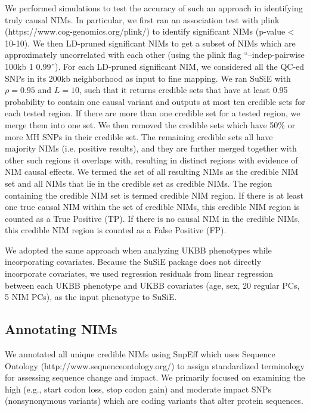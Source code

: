 We performed simulations to test the accuracy of such an approach in identifying truly causal NIMs. In particular, we first ran an association test with plink (https://www.cog-genomics.org/plink/) to identify significant NIMs (p-value < 10-10). We then LD-pruned significant NIMs to get a subset of NIMs which are approximately uncorrelated with each other (using the plink flag ``--indep-pairwise 100kb 1 0.99''). For each LD-pruned significant NIM, we considered all the QC-ed SNPs in its 200kb neighborhood as input to fine mapping. We ran SuSiE with $\rho = 0.95$ and $L = 10$, such that it returns credible sets that have at least 0.95 probability to contain one causal variant and outputs at most ten credible sets for each tested region. If there are more than one credible set for a tested region, we merge them into one set. We then removed the credible sets which have 50\% or more MH SNPs in their credible set. The remaining credible sets all have majority NIMs (i.e. positive results), and they are further merged together with other such regions it overlaps with, resulting in distinct regions with evidence of NIM causal effects. We termed the set of all resulting NIMs as the credible NIM set and all NIMs that lie in the credible set as credible NIMs. The region containing the credible NIM set is termed credible NIM region. If there is at least one true causal NIM within the set of credible NIMs, this credible NIM region is counted as a True Positive (TP). If there is no causal NIM in the credible NIMs, this credible NIM region is counted as a False Positive (FP). 
 
We adopted the same approach when analyzing UKBB phenotypes while incorporating covariates. Because the SuSiE package does not directly incorporate covariates, we used regression residuals from linear regression between each UKBB phenotype and UKBB covariates (age, sex, 20 regular PCs, 5 NIM PCs), as the input phenotype to SuSiE.   

\subsection{Annotating NIMs}
We annotated all unique credible NIMs using SnpEff \cite{cingolani2012program} which uses Sequence Ontology (http://www.sequenceontology.org/) to assign standardized terminology for assessing sequence change and impact. We primarily focused on examining the high (e.g., start codon loss, stop codon gain) and moderate impact SNPs (nonsynonymous variants) which are coding variants that alter protein sequences.

